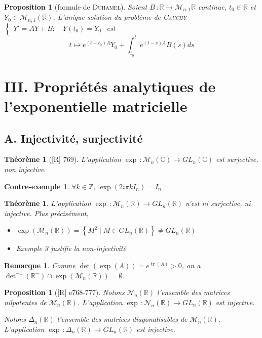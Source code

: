 \documentclass[10pt, a4paper, parskip=full, twoside, twocolumn]{report}
\newtheorem{theorem}[definition]{Théorème}
\newtheorem{proposition}[definition]{Proposition}
\newtheorem{cexample}[definition]{Contre-exemple}
\newtheorem{remark}[definition]{Remarque}
\newcommand{\IZ}{\mathbb{Z}}
\newcommand{\IC}{\mathbb{C}}
\newcommand{\IR}{\mathbb{R}}
\newcommand{\M}{\mathcal{M}}
\DeclareMathOperator{\tr}{tr}
\begin{document}
\begin{proposition}[formule de \textsc{Duhamel}]
	Soient $B\,\colon \IR\to \M_{n,1}{\IR}$ continue, $t_0\in\IR$ et $Y_0\in\M_{n,1}(\IR)$.
	L'unique solution du problème de \textsc{Cauchy}
	$\begin{cases}
		Y' = AY + B ;\quad Y(t_0) = Y_0
	\end{cases}$ est 
	$$t\mapsto e^{(t-t_0)A}Y_0 + \int_{t_0}^t e^{(t-s)A}B(s)ds$$
\end{proposition}


\section*{III. Propriétés analytiques de l'exponentielle matricielle}
\subsection*{A. Injectivité, surjectivité}

\begin{theorem}[\textnormal{[R] 769}]
	L'application $\exp\,\colon \M_n(\IC)\to GL_n(\IC)$ est surjective, non injective.
\end{theorem}

\begin{cexample}
	$\forall k\in\IZ$, $\exp(2i\pi kI_n)= I_n$
\end{cexample}

\begin{theorem}
	L'application $\exp\,\colon \M_n(\IR)\to GL_n(\IR)$ n'est ni surjective, ni injective.
	Plus précisément,
	\begin{itemize}
		\item $\exp(\M_n(\IR)) = \left\{M^2 \mid M\in GL_n(\IR)\right\} \neq GL_n(\IR)$
		\item Exemple 3 justifie la non-injectivité
	\end{itemize}
\end{theorem}

\begin{remark}
	Comme $\det(\exp(A)) = e^{\tr (A)} > 0$, on a $\det^{-1}(\IR^-)\cap \exp(\M_n(\IR)) = \emptyset$.
\end{remark}

\begin{proposition}[\textnormal{[R] e768-777}]
	Notons $\mathcal{N}_n(\IR)$ l'ensemble des matrices nilpotentes de $\M_n(\IR)$.
	L'application $\exp\,\colon \mathcal{N}_n(\IR) \to GL_n(\IR)$ est injective.

	Notons $\Delta_n(\IR)$ l'ensemble des matrices diagonalisables de $\M_n(\IR)$.
	L'application $\exp\,\colon \Delta_n(\IR)\to  GL_n(\IR)$ est injective.
\end{proposition}
\end{document}
